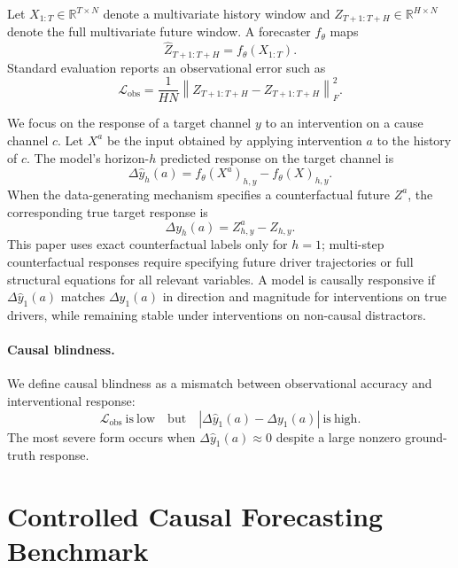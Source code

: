 \documentclass{article}
\begin{document}
Let $X_{1:T} \in \mathbb{R}^{T \times N}$ denote a multivariate history window and
$Z_{T+1:T+H} \in \mathbb{R}^{H \times N}$ denote the full multivariate future
window. A forecaster
$f_\theta$ maps
\begin{equation}
\hat{Z}_{T+1:T+H} = f_\theta(X_{1:T}).
\end{equation}
Standard evaluation reports an observational error such as
\begin{equation}
\mathcal{L}_{\mathrm{obs}} =
\frac{1}{HN}\left\|\hat{Z}_{T+1:T+H} - Z_{T+1:T+H}\right\|_F^2.
\end{equation}

We focus on the response of a target channel $y$ to an intervention on a cause
channel $c$. Let $X^a$ be the input obtained by applying intervention $a$ to the
history of $c$. The model's horizon-$h$ predicted response on the target channel is
\begin{equation}
\Delta \hat{y}_{h}(a) = f_\theta(X^a)_{h,y} - f_\theta(X)_{h,y}.
\end{equation}
When the data-generating mechanism specifies a counterfactual future $Z^a$, the
corresponding true target response is
\begin{equation}
\Delta y_{h}(a) = Z^a_{h,y} - Z_{h,y}.
\end{equation}
This paper uses exact counterfactual labels only for $h=1$; multi-step
counterfactual responses require specifying future driver trajectories or full
structural equations for all relevant variables. A model is causally responsive if
$\Delta \hat{y}_{1}(a)$ matches $\Delta y_{1}(a)$ in direction and magnitude for
interventions on true drivers, while remaining stable under interventions on
non-causal distractors.

\paragraph{Causal blindness.}
We define causal blindness as a mismatch between observational accuracy and
interventional response:
\begin{equation}
\mathcal{L}_{\mathrm{obs}} \ \mathrm{is\ low}
\quad \mathrm{but} \quad
\left|\Delta \hat{y}_{1}(a) - \Delta y_{1}(a)\right| \ \mathrm{is\ high}.
\end{equation}
The most severe form occurs when $\Delta \hat{y}_{1}(a)\approx 0$ despite a large nonzero
ground-truth response.

\section{Controlled Causal Forecasting Benchmark}
\end{document}

